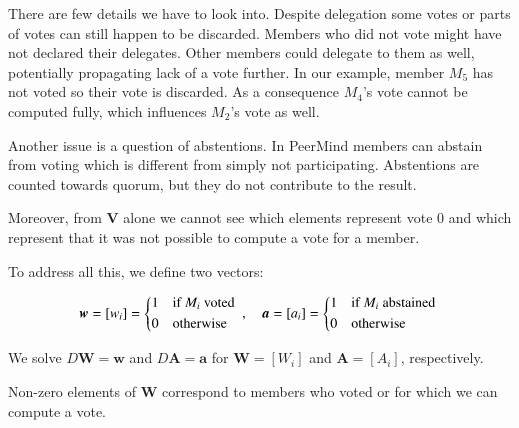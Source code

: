 \documentclass{sigchi}
\begin{document}
There are few details we have to look into.
Despite delegation some votes or parts of votes can still happen to be discarded.
Members who did not vote might have not declared their delegates.
Other members could delegate to them as well, potentially propagating lack of a vote further.
In our example, member $M_5$ has not voted so their vote is discarded.
As a consequence $M_4$'s vote cannot be computed fully, which influences $M_2$'s vote as well.

Another issue is a question of abstentions.
In PeerMind members can abstain from voting which is different from simply not participating.
Abstentions are counted towards quorum, but they do not contribute to the result.

Moreover, from $\boldsymbol{V}$ alone we cannot see which elements represent vote $0$ and which
represent that it was not possible to compute a vote for a member.

To address all this, we define two vectors:

\begin{displaymath}
\boldsymbol{w} = \left[w_i\right] = \begin{dcases*}
 1 & if $M_i$ voted \\
 0 & otherwise \\
\end{dcases*},\quad \boldsymbol{a} = \left[a_i\right] = \begin{dcases*}
 1 & if $M_i$ abstained \\
 0 & otherwise \\
\end{dcases*}
\end{displaymath}

We solve $D \boldsymbol{W} = \boldsymbol{w}$ and $D \boldsymbol{A} = \boldsymbol{a}$ for
$\boldsymbol{W} = \left[W_{i}\right]$ and $\boldsymbol{A} = \left[A_{i}\right]$, respectively.

Non-zero elements of $\boldsymbol{W}$ correspond to members who voted or for which we can compute
a vote.

\end{document}

